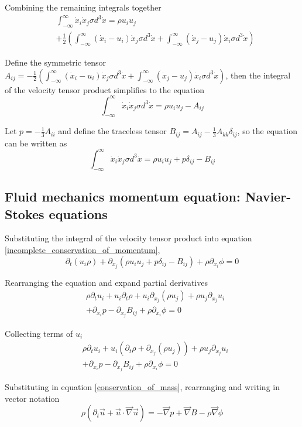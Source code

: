 \documentclass[%
 reprint,
 amsmath,amssymb,
 aps,
]{revtex4-1}
\newcommand{\grad}{\vec{\nabla}}
\newcommand{\intVdot}[1]{\int_{-\infty}^{\infty} #1 d^3\dot{x}}
\begin{document}
Combining the remaining integrals together
\[
\begin{split}
& \intVdot{\dot{x}_i\dot{x}_j\sigma}=\rho u_i u_j \\ & + \frac{1}{2}\left(\intVdot{\left(\dot{x}_i - u_i\right)\dot{x}_j\sigma} + \intVdot{\left(\dot{x}_j - u_j\right)\dot{x}_i\sigma}\right)
\end{split}
\]

Define the symmetric tensor $A_{ij} = -\frac{1}{2}\left(\intVdot{\left(\dot{x}_i - u_i\right)\dot{x}_j\sigma} + \intVdot{\left(\dot{x}_j - u_j\right)\dot{x}_i\sigma}\right)$, then the integral of the velocity tensor product simplifies to the equation
\[
\intVdot{\dot{x}_i\dot{x}_j\sigma}=\rho u_i u_j - A_{ij}
\]

Let $p=-\frac{1}{3}A_{ii}$ and define the traceless tensor $B_{ij}=A_{ij}-\frac{1}{3}A_{kk}\delta_{ij}$, so the equation can be written as
\[
\intVdot{\dot{x}_i\dot{x}_j\sigma}=\rho u_i u_j + p\delta_{ij} - B_{ij}
\]

\subsection{Fluid mechanics momentum equation: Navier-Stokes equations}
Substituting the integral of the velocity tensor product into equation \eqref{incomplete_conservation_of_momentum},
\[
\partial_t\left(u_i\rho\right) + \partial_{x_j}\left(\rho u_i u_j + p\delta_{ij}-B_{ij}\right) + \rho\partial_{x_i}\phi=0
\]

Rearranging the equation and expand partial derivatives
\[
\begin{split}
&\rho\partial_t u_i +  u_i\partial_t\rho + u_i\partial_{x_j}\left(\rho u_j\right) + \rho u_j\partial_{x_j}u_i \\ & + \partial_{x_i}p - \partial_{x_j}B_{ij} + \rho\partial_{x_i}\phi=0
\end{split}
\]

Collecting terms of $u_i$
\[
\begin{split}
&\rho\partial_t u_i +  u_i\left(\partial_t\rho + \partial_{x_j}\left(\rho u_j\right)\right) + \rho u_j\partial_{x_j}u_i \\ & + \partial_{x_i}p - \partial_{x_j}B_{ij} + \rho\partial_{x_i}\phi=0
\end{split}
\]

Substituting in equation \eqref{conservation_of_mass}, rearranging and writing in vector notation
\begin{equation}
\rho\left(\partial_t \vec{u} + \vec{u}\cdot\grad\vec{u}\right) = - \grad p + \grad B - \rho\grad\phi
\label{conservation_of_momentum}
\end{equation}
\end{document}
